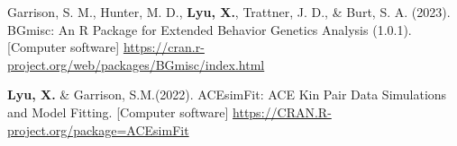 
\begin{cvpublications}
  \cvpublication
    {Garrison, S. M., Hunter, M. D., \textbf{Lyu, X.}, Trattner, J. D., \& Burt, S. A. (2023). BGmisc: An R Package for Extended Behavior Genetics Analysis (1.0.1). [Computer software] \url{https://cran.r-project.org/web/packages/BGmisc/index.html}}

  \cvpublication
    {\textbf{Lyu, X.} \& Garrison, S.M.(2022). ACEsimFit: ACE Kin Pair Data Simulations and Model Fitting. [Computer software] 
    \url{https://CRAN.R-project.org/package=ACEsimFit}} 
\end{cvpublications}

